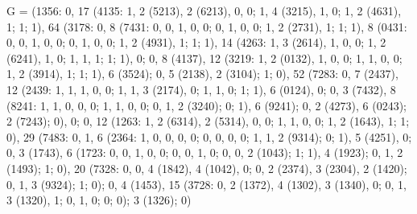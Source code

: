 {G = (1356: 0, 17 (4135: 1, 2 (5213), 2 (6213), 0, 0; 1, 4 (3215), 1, 0; 1, 2 (4631), 1; 1; 1), 64 (3178: 0, 8 (7431: 0, 0, 1, 0, 0; 0, 1, 0, 0; 1, 2 (2731), 1; 1; 1), 8 (0431: 0, 0, 1, 0, 0; 0, 1, 0, 0; 1, 2 (4931), 1; 1; 1), 14 (4263: 1, 3 (2614), 1, 0, 0; 1, 2 (6241), 1, 0; 1, 1, 1; 1; 1), 0; 0, 8 (4137), 12 (3219: 1, 2 (0132), 1, 0, 0; 1, 1, 0, 0; 1, 2 (3914), 1; 1; 1), 6 (3524); 0, 5 (2138), 2 (3104); 1; 0), 52 (7283: 0, 7 (2437), 12 (2439: 1, 1, 1, 0, 0; 1, 1, 3 (2174), 0; 1, 1, 0; 1; 1), 6 (0124), 0; 0, 3 (7432), 8 (8241: 1, 1, 0, 0, 0; 1, 1, 0, 0; 0, 1, 2 (3240); 0; 1), 6 (9241); 0, 2 (4273), 6 (0243); 2 (7243); 0), 0; 0, 12 (1263: 1, 2 (6314), 2 (5314), 0, 0; 1, 1, 0, 0; 1, 2 (1643), 1; 1; 0), 29 (7483: 0, 1, 6 (2364: 1, 0, 0, 0, 0; 0, 0, 0, 0; 1, 1, 2 (9314); 0; 1), 5 (4251), 0; 0, 3 (1743), 6 (1723: 0, 0, 1, 0, 0; 0, 0, 1, 0; 0, 0, 2 (1043); 1; 1), 4 (1923); 0, 1, 2 (1493); 1; 0), 20 (7328: 0, 0, 4 (1842), 4 (1042), 0; 0, 2 (2374), 3 (2304), 2 (1420); 0, 1, 3 (9324); 1; 0); 0, 4 (1453), 15 (3728: 0, 2 (1372), 4 (1302), 3 (1340), 0; 0, 1, 3 (1320), 1; 0, 1, 0; 0; 0); 3 (1326); 0)

}
